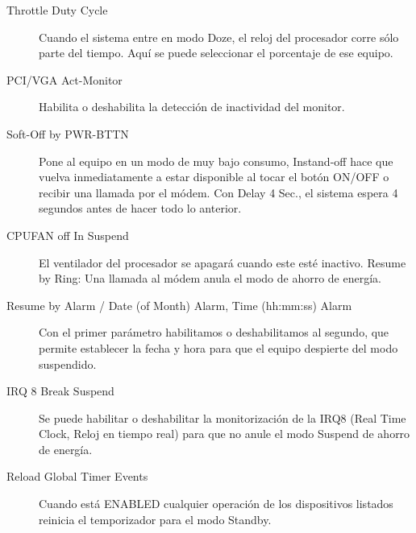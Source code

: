 \begin{description}
				\item[Throttle Duty Cycle] Cuando el sistema entre en modo
					Doze, el reloj del procesador corre sólo parte del tiempo.
					Aquí se puede seleccionar el porcentaje de ese equipo.
				\item[PCI/VGA Act-Monitor] Habilita o deshabilita la detección
					de inactividad del monitor.
				\item[Soft-Off by PWR-BTTN] Pone al equipo en un modo de muy
					bajo consumo, Instand-off hace que vuelva inmediatamente a
					estar disponible al tocar el botón ON/OFF o recibir una
					llamada por el módem. Con Delay 4 Sec., el sistema espera 4
					segundos antes de hacer todo lo anterior.
				\item[CPUFAN off In Suspend] El ventilador del procesador se
					apagará cuando este esté inactivo.  Resume by Ring: Una
					llamada al módem anula el modo de ahorro de energía.
				\item[Resume by Alarm / Date (of Month) Alarm, Time (hh:mm:ss)
					Alarm] Con el primer parámetro habilitamos o deshabilitamos
					al segundo, que permite establecer la fecha y hora para que
					el equipo despierte del modo suspendido.
				\item[IRQ 8 Break Suspend] Se puede habilitar o deshabilitar la
					monitorización de la IRQ8 (Real Time Clock, Reloj en tiempo
					real) para que no anule el modo Suspend de ahorro de
					energía.
				\item[Reload Global Timer Events] Cuando está ENABLED cualquier
					operación de los dispositivos listados reinicia el
					temporizador para el modo Standby.
			\end{description}
			\newpage
